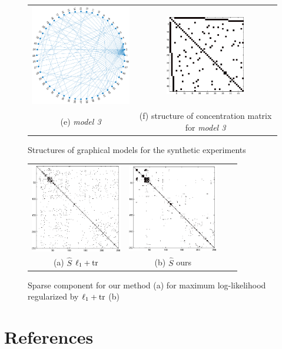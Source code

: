 \documentclass{article}
\begin{document}
\begin{figure}
\begin{tabular}{cc}
      \includegraphics[width=6cm]{fig/diff_graph} 
  &   \includegraphics[width=3.5cm]{fig/diff_true}
   \\    (e) \textit{model 3} & (f)  structure of concentration matrix for \textit{model 3}
\end{tabular}
\caption{ Structures of graphical models for the synthetic experiments}
\end{figure}

\begin{figure}
\center
\begin{tabular}{cccc}
      \includegraphics[width=4cm]{fig/MILE_Som}
  &   \includegraphics[height=3.8cm]{fig/MILE_Ssl_ordered}
   \\   (a)  $\hat{S}$ $\ell_1+{\rm tr}$  & (b) $\hat{S}$ ours 
\end{tabular}
\caption{Sparse component for our method (a) for maximum log-likelihood regularized by $\ell_1+{\rm tr}$ (b) }
\end{figure}


\section*{References}


\end{document}
